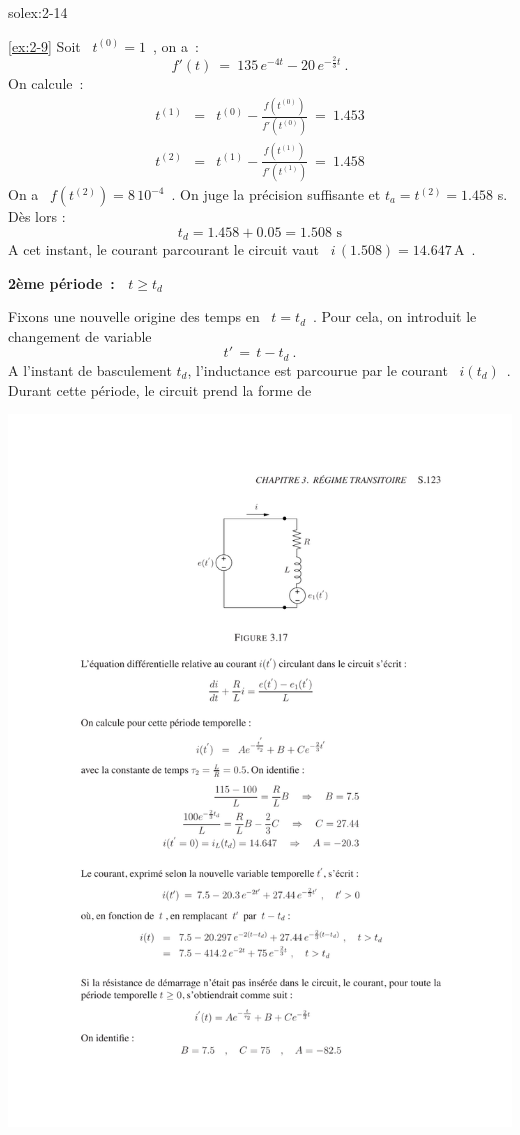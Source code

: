 \begin{exwithsol}{solex:2-14}
\begin{solexercise}{\ref{ex:2-9}}
Soit \ $t^{(0)} = 1$~, on a~:
\[ f'(t) \: = \: 135\, e^{-4t} - 20 \, e^{-\frac{2}{3}t}~.\]
On calcule~:
\begin{eqnarray*}
	t^{(1)} &=& t^{(0)} - \frac{f(t^{(0)})}{f'(t^{(0)})} \: = \: 1.453\\
	t^{(2)} &=& t^{(1)} - \frac{f(t^{(1)})}{f'(t^{(1)})} \: = \: 1.458
\end{eqnarray*}
On a \ $f(t^{(2)}) = 8\, 10^{-4}$~. On juge la pr\'ecision suffisante et
$t_a = t^{(2)} = 1.458$ s. D\`es lors :
\[t_d=1.458+0.05=1.508\,\, \mbox{s}\]
A cet instant, le courant parcourant le circuit vaut \ $i\, (1.508) =
14.647\,$A~.

\vspace{\baselineskip}
{\bf 2\`eme p\'eriode~: \ $ t \geq  t_d$}

Fixons une nouvelle origine des temps en \ $t=t_d$~. Pour cela, on introduit le changement de variable
\[ t' \, = \, t - t_d~. \]
A l'instant de basculement $t_d$, l'inductance est parcourue par le courant \ $i(t_d)$~.
Durant cette p\'eriode, le circuit prend la forme de 
\begin{center}
	\includegraphics[width=\linewidth]{sol_exercices/ex3-9-3}
\end{center}



\end{solexercise}
\end{exwithsol}
